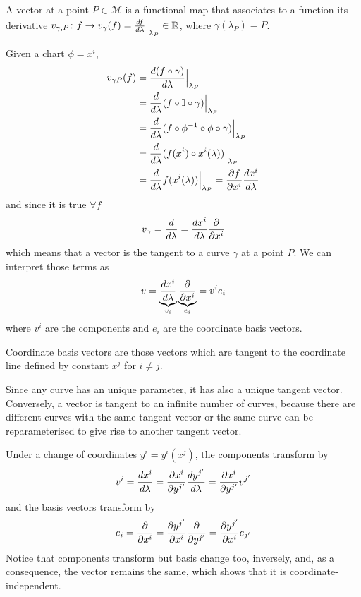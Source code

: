    \begin{definition}[Vector]
        A vector at a point $P \in \mathcal M$ is a functional map that associates to a function its derivative $v_{\gamma, P} \colon f \rightarrow v_\gamma(f) = \frac{df}{d\lambda} \Big \vert_{\lambda_P} \in \mathbb R$, where $\gamma(\lambda_P) = P$.
    \end{definition} 
    \noindent Given a chart $\phi = x^i$,
    \begin{equation*}
    \begin{aligned}
        v_{\gamma P} (f) & = \frac{d(f \circ \gamma)}{d\lambda} \Big\vert_{\lambda_P} \\ & = \frac{d}{d\lambda} (f \circ \mathbb I \circ \gamma) \Big\vert_{\lambda_P} \\ & = \frac{d}{d\lambda} (f \circ \phi^{-1} \circ \phi \circ \gamma) \Big\vert_{\lambda_P} \\ & = \frac{d}{d\lambda} (f(x^i) \circ x^i(\lambda)) \Big\vert_{\lambda_P} \\ & = \frac{d}{d\lambda} f(x^i(\lambda)) \Big\vert_{\lambda_P} = \frac{\partial f}{\partial x^i} \frac{dx^i}{d\lambda}
    \end{aligned}
    \end{equation*}
    and since it is true $\forall f$
    \begin{equation*}
        v_\gamma = \frac{d}{d\lambda} = \frac{dx^i}{d\lambda} \frac{\partial}{\partial x^i} 
    \end{equation*}
    which means that a vector is the tangent to a curve $\gamma$ at a point $P$. We can interpret those terms as
    \begin{equation*}
        v = \underbrace{\frac{dx^i}{d\lambda}}_{v_i} \underbrace{\frac{\partial}{\partial x^i}}_{e_i} = v^i e_i
    \end{equation*}
    where $v^i$ are the components and $e_i$ are the coordinate basis vectors. 
    
    \begin{definition}
        Coordinate basis vectors are those vectors which are tangent to the coordinate line defined by constant $x^j$ for $i \neq j$.
    \end{definition}

    Since any curve has an unique parameter, it has also a unique tangent vector. Conversely, a vector is tangent to an infinite number of curves, because there are different curves with the same tangent vector or the same curve can be reparameterised to give rise to another tangent vector.

    Under a change of coordinates $y^i = y^i(x^j)$, the components transform by 
    \begin{equation*}
        v^i = \frac{dx^i}{d\lambda} = \frac{\partial x^i}{\partial y^{j'}} \frac{dy^{j'}}{d\lambda} = \frac{\partial x^i}{\partial y^{j'}} v^{j'}
    \end{equation*}
    and the basis vectors transform by 
    \begin{equation*}
        e_i = \frac{\partial}{\partial x^i} = \frac{\partial y^{j'}}{\partial x^i} \frac{\partial}{\partial y^{j'}} = \frac{\partial y^{j'}}{\partial x^i} e_{j'}
    \end{equation*}
    \noindent Notice that components transform but basis change too, inversely, and, as a consequence, the vector remains the same, which shows that it is coordinate-independent.

